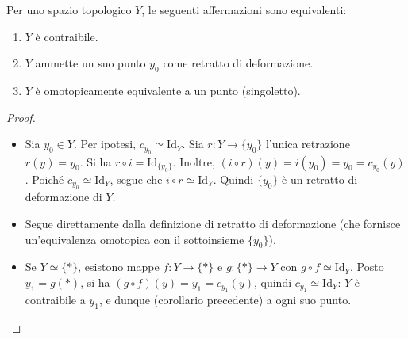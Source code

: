 \vspace{1.5em}

\begin{teo}
Per uno spazio topologico $Y$, le seguenti affermazioni sono equivalenti:
\begin{enumerate}
    \item $Y$ è contraibile.
    \item $Y$ ammette un suo punto $y_0$ come retratto di deformazione.
    \item $Y$ è omotopicamente equivalente a un punto (singoletto).
\end{enumerate}
\end{teo}

\begin{proof}
\begin{itemize}
    \item[$(1) \implies (2)$:] Sia $y_0 \in Y$. Per ipotesi, $c_{y_0} \simeq \mathrm{Id}_Y$.
    Sia $r: Y \to \{y_0\}$ l'unica retrazione $r(y) = y_0$. Si ha $r \circ i = \mathrm{Id}_{\{y_0\}}$.
    Inoltre, $(i \circ r)(y) = i(y_0) = y_0 = c_{y_0}(y)$. Poiché $c_{y_0} \simeq \mathrm{Id}_Y$, segue che $i \circ r \simeq \mathrm{Id}_Y$.
    Quindi $\{y_0\}$ è un retratto di deformazione di $Y$.

    \item[$(2) \implies (3)$:] Segue direttamente dalla definizione di retratto di deformazione (che fornisce un'equivalenza omotopica con il sottoinsieme $\{y_0\}$).

    \item[$(3) \implies (1)$:] Se $Y \simeq \{*\}$, esistono mappe $f: Y \to \{*\}$ e $g: \{*\} \to Y$ con $g \circ f \simeq \mathrm{Id}_Y$. Posto $y_1 = g(*)$, si ha $(g \circ f)(y) = y_1 = c_{y_1}(y)$, quindi $c_{y_1} \simeq \mathrm{Id}_Y$: $Y$ è contraibile a $y_1$, e dunque (corollario precedente) a ogni suo punto.
\end{itemize}
\end{proof}

\vspace{1.5em}

